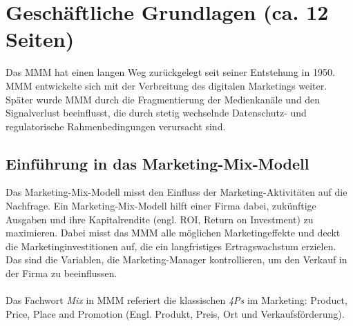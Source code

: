\newpage
\section{Geschäftliche Grundlagen (ca. 12 Seiten)}
\label{GeschäftlicheGrundlagen}
Das \ac{MMM} hat einen langen Weg zurückgelegt seit seiner Entstehung in 1950. \ac{MMM} entwickelte sich mit der Verbreitung des digitalen Marketings weiter. Später wurde \ac{MMM} durch die Fragmentierung der Medienkanäle und den Signalverlust beeinflusst, die durch stetig wechselnde Datenschutz- und regulatorische Rahmenbedingungen verursacht sind\cite{MMMdef}.
\subsection{Einführung in das Marketing-Mix-Modell}
\label{EinführungInDasMMM}
Das Marketing-Mix-Modell misst den Einfluss der Marketing-Aktivitäten auf die Nachfrage. Ein Marketing-Mix-Modell hilft einer Firma dabei, zukünftige Ausgaben und ihre Kapitalrendite (engl. \ac{ROI}, Return on Investment) zu maximieren. Dabei misst das \ac{MMM} alle möglichen Marketingeffekte und deckt die Marketinginvestitionen auf, die ein langfristiges Ertragswachstum erzielen. Das sind die Variablen, die Marketing-Manager kontrollieren, um den Verkauf in der Firma zu beeinflussen. \\\\Das Fachwort \textit{Mix} in \ac{MMM} referiert die klassischen \textit{4Ps} im Marketing: Product, Price, Place and Promotion (Engl. Produkt, Preis, Ort und Verkaufsförderung)\cite[S. 109 ff]{akinkunmi2018data}. \\\\
